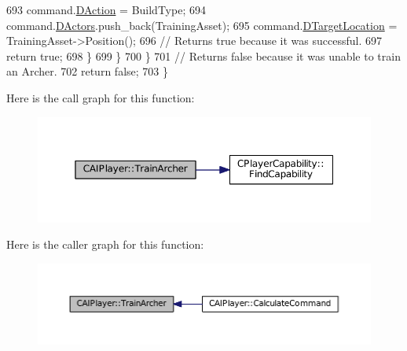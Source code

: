 \begin{DoxyCode}
693                 command.\hyperlink{structSPlayerCommandRequest_a80897bbccf2c4e0b148a7aa815a926c6}{DAction} = BuildType;
694                 command.\hyperlink{structSPlayerCommandRequest_aa37fc01519676345703d78b9f573894a}{DActors}.push\_back(TrainingAsset);       
695                 command.\hyperlink{structSPlayerCommandRequest_a701702b94ca2fd2738e95ef6711dd41a}{DTargetLocation} = TrainingAsset->Position();
696                 \textcolor{comment}{// Returns true because it was successful.}
697                 \textcolor{keywordflow}{return} \textcolor{keyword}{true};
698             \}
699         \}
700     \}
701      \textcolor{comment}{// Returns false because it was unable to train an Archer.}
702     \textcolor{keywordflow}{return} \textcolor{keyword}{false};
703 \}
\end{DoxyCode}
Here is the call graph for this function\+:\nopagebreak
\begin{figure}[H]
\begin{center}
\leavevmode
\includegraphics[width=350pt]{classCAIPlayer_af2edf1e3c54d6af693f768f86d484fd6_cgraph}
\end{center}
\end{figure}
Here is the caller graph for this function\+:\nopagebreak
\begin{figure}[H]
\begin{center}
\leavevmode
\includegraphics[width=350pt]{classCAIPlayer_af2edf1e3c54d6af693f768f86d484fd6_icgraph}
\end{center}
\end{figure}
\hypertarget{classCAIPlayer_aa3f9c1d0d449a45a24e065d2086527b0}{}\label{classCAIPlayer_aa3f9c1d0d449a45a24e065d2086527b0} 
